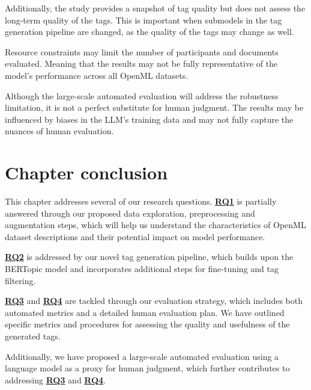 Additionally, the study provides a snapshot of tag quality but does not assess the long-term quality of the tags. This is important when submodels in the tag generation pipeline are changed, as the quality of the tags may change as well.

Resource constraints may limit the number of participants and documents evaluated. Meaning that the results may not be fully representative of the model's performance across all OpenML datasets.

Although the large-scale automated evaluation will address the robustness limitation, it is not a perfect substitute for human judgment. The results may be influenced by biases in the LLM's training data and may not fully capture the nuances of human evaluation.

\section{Chapter conclusion}
This chapter addresses several of our research questions. \hyperref[rq1]{\textbf{RQ1}} is partially answered through our proposed data exploration, preprocessing and augmentation steps, which will help us understand the characteristics of OpenML dataset descriptions and their potential impact on model performance.

\hyperref[rq2]{\textbf{RQ2}} is addressed by our novel tag generation pipeline, which builds upon the BERTopic model and incorporates additional steps for fine-tuning and tag filtering.

\hyperref[rq3]{\textbf{RQ3}} and \hyperref[rq4]{\textbf{RQ4}} are tackled through our evaluation strategy, which includes both automated metrics and a detailed human evaluation plan. We have outlined specific metrics and procedures for assessing the quality and usefulness of the generated tags.

Additionally, we have proposed a large-scale automated evaluation using a language model as a proxy for human judgment, which further contributes to addressing \hyperref[rq3]{\textbf{RQ3}} and \hyperref[rq4]{\textbf{RQ4}}.